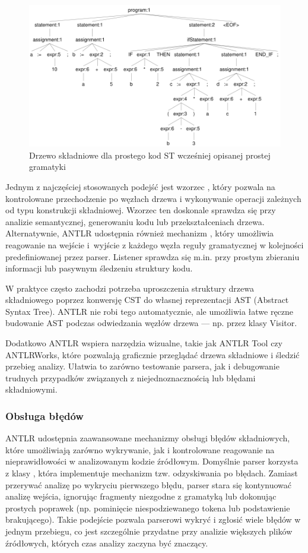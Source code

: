 \documentclass[12pt,twoside]{article}
\begin{document}
\begin{figure}[ht]
   \centering
   \includegraphics[width=15cm]{images/biggerTreeSimple.png}
   \caption{Drzewo składniowe dla prostego kod ST wcześniej opisanej prostej gramatyki}
   \label{Fig:biggerGrammarTree}
\end{figure}

Jednym z najczęściej stosowanych podejść jest wzorzec , który pozwala na kontrolowane przechodzenie po węzłach drzewa i wykonywanie operacji zależnych od typu konstrukcji składniowej. Wzorzec ten doskonale sprawdza się przy analizie semantycznej, generowaniu kodu lub przekształceniach drzewa. Alternatywnie, ANTLR udostępnia również mechanizm , który umożliwia reagowanie na wejście i~wyjście z każdego węzła reguły gramatycznej w kolejności predefiniowanej przez parser. Listener sprawdza się m.in. przy prostym zbieraniu informacji lub pasywnym śledzeniu struktury kodu.

W praktyce często zachodzi potrzeba uproszczenia struktury drzewa składniowego poprzez konwersję CST do własnej reprezentacji AST (Abstract Syntax Tree). ANTLR nie robi tego automatycznie, ale umożliwia łatwe ręczne budowanie AST podczas odwiedzania węzłów drzewa — np. przez klasy Visitor.

Dodatkowo ANTLR wspiera narzędzia wizualne, takie jak ANTLR Tool czy ANTLRWorks, które pozwalają graficznie przeglądać drzewa składniowe i śledzić przebieg analizy. Ułatwia to zarówno testowanie parsera, jak i debugowanie trudnych przypadków związanych z niejednoznacznością lub błędami składniowymi.

\subsubsection{Obsługa błędów}
ANTLR udostępnia zaawansowane mechanizmy obsługi błędów składniowych, które umożliwiają zarówno wykrywanie, jak i kontrolowane reagowanie na nieprawidłowości w analizowanym kodzie źródłowym. Domyślnie parser korzysta z klasy , która implementuje mechanizm tzw. odzyskiwania po błędach. Zamiast przerywać analizę po wykryciu pierwszego błędu, parser stara się kontynuować analizę wejścia, ignorując fragmenty niezgodne z gramatyką lub dokonując prostych poprawek (np. pominięcie niespodziewanego tokena lub podstawienie brakującego). Takie podejście pozwala parserowi wykryć i zgłosić wiele błędów w jednym przebiegu, co jest szczególnie przydatne przy analizie większych plików źródłowych, których czas analizy zaczyna być znaczący.
\end{document}
